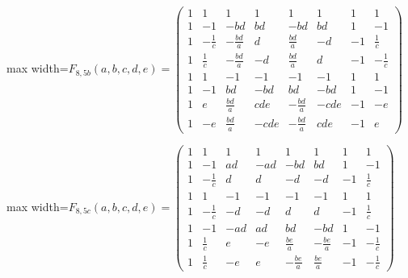 \documentclass[11pt,a4paper]{article}
\theoremstyle{plain}
\theoremstyle{definition}
\numberwithin{equation}{section}
\begin{document}
\begin{center}\normalsize\setlength{\arraycolsep}{3.8pt}
\begin{adjustbox}{max width=\textwidth}$\displaystyle F_{8,5b}(a,b,c,d,e)=\begin{pmatrix}
1 & 1 & 1 & 1 & 1 & 1 & 1 & 1 \\
1 & -1 & -bd & bd & -bd & bd & 1 & -1 \\
1 & -\frac{1}{c} & -\frac{bd}{a} & d & \frac{bd}{a} & -d & -1 & \frac{1}{c} \\
1 & \frac{1}{c} & -\frac{bd}{a} & -d & \frac{bd}{a} & d & -1 & -\frac{1}{c} \\
1 & 1 & -1 & -1 & -1 & -1 & 1 & 1 \\
1 & -1 & bd & -bd & bd & -bd & 1 & -1 \\
1 & e & \frac{bd}{a} & cde & -\frac{bd}{a} & -cde & -1 & -e \\
1 & -e & \frac{bd}{a} & -cde & -\frac{bd}{a} & cde & -1 & e
\end{pmatrix}$\end{adjustbox}
\end{center}

\begin{center}\normalsize\setlength{\arraycolsep}{3.8pt}
\begin{adjustbox}{max width=\textwidth}$\displaystyle F_{8,5c}(a,b,c,d,e)=\begin{pmatrix}
1 & 1 & 1 & 1 & 1 & 1 & 1 & 1 \\
1 & -1 & ad & -ad & -bd & bd & 1 & -1 \\
1 & -\frac{1}{c} & d & d & -d & -d & -1 & \frac{1}{c} \\
1 & 1 & -1 & -1 & -1 & -1 & 1 & 1 \\
1 & -\frac{1}{c} & -d & -d & d & d & -1 & \frac{1}{c} \\
1 & -1 & -ad & ad & bd & -bd & 1 & -1 \\
1 & \frac{1}{c} & e & -e & \frac{be}{a} & -\frac{be}{a} & -1 & -\frac{1}{c} \\
1 & \frac{1}{c} & -e & e & -\frac{be}{a} & \frac{be}{a} & -1 & -\frac{1}{c}
\end{pmatrix}$\end{adjustbox}
\end{center}
\end{document}
